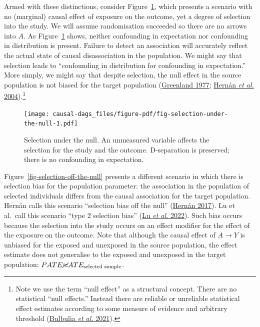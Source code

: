 \documentclass[
  singlecolumn]{article}
\begin{document}
Armed with these distinctions, consider
Figure~\ref{fig-selection-under-the-null}, which presents a scenario
with no (marginal) causal effect of exposure on the outcome, yet a
degree of selection into the study. We will assume randomisation
succeeded so there are no arrows into \(A\). As
Figure~\ref{fig-selection-under-the-null} shows, neither confounding in
expectation nor confounding in distribution is present. Failure to
detect an association will accurately reflect the actual state of causal
disassociation in the population. We might say that selection leads to
``confounding in distribution for confounding in expectation.'' More
simply, we might say that despite selection, the null effect in the
source population is not biased for the target population
(\protect\hyperlink{ref-greenland1977}{Greenland 1977};
\protect\hyperlink{ref-hernuxe1n2004}{Hernán \emph{et al.}
2004}).\footnote{Note we use the term ``null effect'' as a structural
  concept. There are no statistical ``null effects.'' Instead there are
  reliable or unreliable statistical effect estimates according to some
  measure of evidence and arbitrary threshold
  (\protect\hyperlink{ref-bulbulia2021}{Bulbulia \emph{et al.} 2021}).}

\begin{figure}

{\centering \texttt{[image: causal-dags\_files/figure-pdf/fig-selection-under-the-null-1.pdf]}

}

\caption{\label{fig-selection-under-the-null}Selection under the null.
An unmeasured variable affects the selection for the study and the
outcome. D-separation is preserved; there is no confounding in
expectation.}

\end{figure}

Figure~\ref{fig-selection-off-the-null} presents a different scenario in
which there is selection bias for the population parameter: the
association in the population of selected individuals differs from the
causal association for the target population. Hernán calls this scenario
``selection bias off the null''
(\protect\hyperlink{ref-hernuxe1n2017}{Hernán 2017}). Lu et al.~call
this scenario ``type 2 selection bias''
(\protect\hyperlink{ref-lu2022}{Lu \emph{et al.} 2022}). Such bias
occurs because the selection into the study occurs on an effect modifier
for the effect of the exposure on the outcome. Note that although the
causal effect of \(A\to Y\) is unbiased for the exposed and unexposed in
the source population, the effect estimate does not generalise to the
exposed and unexposed in the target population:
\(PATE \cancel{\approx} ATE_{\text{selected sample}}\).
\end{document}
